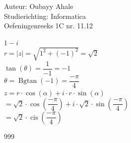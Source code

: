 \documentclass[a4paper]{article}
\begin{document}
  
\noindent \large Auteur: Oubayy Ahale          \\
\noindent \large Studierichting: Informatica   \\
\noindent \large Oefeningenreeks 1C nr. 11.12  \\

\medskip

\normalsize

$ 1 - i $\\

$ r = |z| = \sqrt{1^2 + (-1)^2} = \sqrt{2} $\\

$ \tan(\theta) = \dfrac{1}{-1} = -1        $\\

$ \theta = \operatorname{Bgtan}(-1) = \dfrac{-\pi}{4} $\\

$ z = r \cdot \cos(\alpha) + i \cdot r \cdot \sin(\alpha) $\\

$ = \sqrt{2} \cdot \cos\left(\dfrac{-\pi}{4}\right) + i \cdot \sqrt{2} \cdot \sin\left(\dfrac{-\pi}{4}\right) $\\

$ = \sqrt{2} \cdot \operatorname{cis}\left( \dfrac{-\pi}{4} \right) $\\

\begin{thebibliography}{999}
\end{thebibliography}
\end{document}
